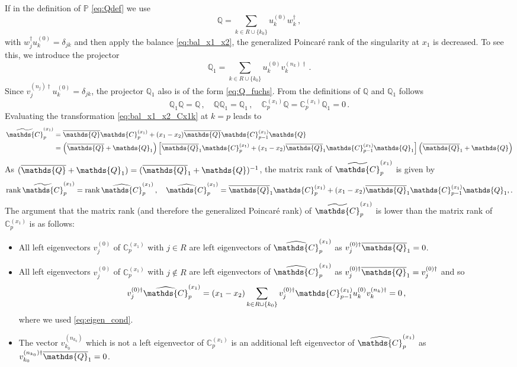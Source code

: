 \documentclass[12pt]{article}
\numberwithin{equation}{section}
\numberwithin{figure}{section}
\newcommand{\C}{\mathds{C}}
\renewcommand{\P}{\mathds{P}}
\newcommand{\Q}{\mathds{Q}}
\newcommand{\Qbar}{\overline\Q}
\DeclareMathOperator{\rank}{rank}
\begin{document}
        If in the definition of $\P$ \eqref{eq:Qdef} we use
        \begin{equation} \label{eq:Q_fuchs}
          \Q = \sum\limits_{k\in R\cup\{k_0\}} u_k^{(0)} w_k^\dagger\,,
        \end{equation}
        with $w_j^\dagger u_k^{(0)} = \delta_{jk}$ and then apply the balance \eqref{eq:bal_x1_x2}, the generalized Poincar\'{e} rank of the singularity at $x_1$ is decreased.
        To see this, we introduce the projector
        \begin{equation} \label{eq:Q1_fuchs}
          \Q_1 = \sum\limits_{k\in R\cup\{k_0\}} u_k^{(0)} v_k^{(n_k)\dagger}\,.
        \end{equation}
        Since $v_j^{(n_j)\dagger} u_k^{(0)} = \delta_{jk}$, the projector $\Q_1$ also is of the form \eqref{eq:Q_fuchs}.
        From the definitions of $\Q$ and $\Q_1$ follows
        \[
          \Q_1 \Q = \Q\,, \quad
          \Q \Q_1 = \Q_1\,, \quad
          \C^{(x_1)}_p \Q = \C^{(x_1)}_p \Q_1 = 0\,.
        \]          
        Evaluating the transformation \eqref{eq:bal_x1_x2_Cx1k} at $k=p$ leads to 
        \begin{align*}
          \widetilde \C^{(x_1)}_p &=
          \Qbar \C^{(x_1)}_p
          +
          (x_1-x_2) \Qbar \C^{(x_1)}_{p-1} \Q \\
          &=
          \left(\Qbar+\Q_1\right) 
          \left[
            \Qbar_1 \C^{(x_1)}_p
            +
            (x_1-x_2) \Qbar_1 \C^{(x_1)}_{p-1} \Q_1
          \right]
          \left(\Qbar_1+\Q\right)
        \end{align*} 
        As $(\Qbar+\Q_1) = (\Qbar_1+\Q)^{-1}$, the matrix rank of $\widetilde \C^{(x_1)}_p$ is given by
        \[
          \rank \widetilde \C^{(x_1)}_p = 
          \rank \widehat\C^{(x_1)}_p\,, \quad
          \widehat\C^{(x_1)}_p =
          \Qbar_1 \C^{(x_1)}_p
          +
          (x_1-x_2) \Qbar_1 \C^{(x_1)}_{p-1} \Q_1,.
        \]
				The argument that the matrix rank (and therefore the generalized Poincar\'{e} rank) of $\widetilde \C^{(x_1)}_p$ is lower than the matrix rank of $\C^{(x_1)}_p$ is as follows:
        \begin{itemize}
          \item
            All left eigenvectors $v_j^{(0)}$ of $\C^{(x_1)}_p$ with $j\in R$ are left eigenvectors of $\widehat \C^{(x_1)}_p$ as $v_j^{(0)\dagger} \Qbar_1 = 0$.
          \item
            All left eigenvectors $v_j^{(0)}$ of $\C^{(x_1)}_p$ with $j\notin R$ are left eigenvectors of $\widehat \C^{(x_1)}_p$ as $v_j^{(0)\dagger} \Qbar_1 = v_j^{(0)\dagger}$ and so
            \[
              v_j^{(0)\dagger} \widehat\C^{(x_1)}_p 
              =
              (x_1-x_2) \sum\limits_{k\in R\cup\{k_0\}} v_j^{(0)\dagger} \C^{(x_1)}_{p-1} u_k^{(0)} v_k^{(n_k)\dagger}
              = 0\,,
            \]
            where we used \eqref{eq:eigen_cond}.
          \item
            The vector $v_{k_0}^{(n_{k_0})}$ which is not a left eigenvector of $\C^{(x_1)}_p$ is an additional left eigenvector of $\widehat \C^{(x_1)}_p$ as $v_{k_0}^{(n_{k_0})\dagger} \Qbar_1 = 0$.
        \end{itemize}
\end{document}
